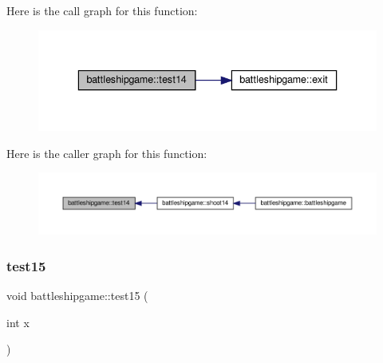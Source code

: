 Here is the call graph for this function\+:
\nopagebreak
\begin{figure}[H]
\begin{center}
\leavevmode
\includegraphics[width=336pt]{classbattleshipgame_a038c75b53a7aeb63718718ddb474d6f9_cgraph}
\end{center}
\end{figure}
Here is the caller graph for this function\+:
\nopagebreak
\begin{figure}[H]
\begin{center}
\leavevmode
\includegraphics[width=350pt]{classbattleshipgame_a038c75b53a7aeb63718718ddb474d6f9_icgraph}
\end{center}
\end{figure}
\mbox{\label{classbattleshipgame_a7d5c9884fcb1d37853a7e25438fe3bf3}} 
\subsubsection{\texorpdfstring{test15}{test15}}
{\footnotesize\ttfamily void battleshipgame\+::test15 (\begin{DoxyParamCaption}\item[{int}]{x }\end{DoxyParamCaption})\hspace{0.3cm}{\ttfamily [slot]}}

